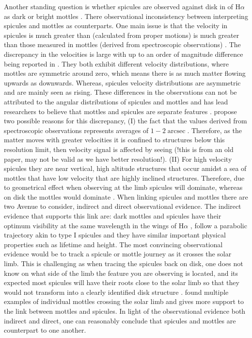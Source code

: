 \documentclass[12pt]{ociamthesis}
\DeclareMathOperator{\arcsec}{arcsec}
\begin{document}
\par Another standing question is whether spicules are observed against disk in of H$\alpha$ as dark or bright mottles \citep{Tsiropoula1993A}. There observational inconsistency between interpreting spicules and mottles as counterparts. One main issue is that the velocity in spicules is much greater than (calculated from proper motions) is much greater than those measured in mottles (derived from spectroscopic observations) \cite{Grossmann1992AA264236G, Christopoulou2001SoPh19961C}. The discrepancy in the velocities is large with up to an order of magnitude difference being reported in \cite{Grossmann1973SoPh28319G}. They both exhibit different velocity distributions, where mottles are symmetric around zero, which means there is as much matter flowing upwards as downwards. Whereas, spicules velocity distributions are asymmetric and  are mainly seen as rising. These differences in the observations can not be attributed to the angular distributions of spicules and mottles \cite{Grossmann1992AA264236G} and has lead researchers to believe that mottles and spicules are separate features \cite{Christopoulou2001SoPh19961C}. \cite{Christopoulou2001SoPh19961C} propose two possible reasons for this discrepancy, (I) the fact that the values derived from spectroscopic observations represents averages of $1-2\arcsec$. Therefore, as the matter moves with greater velocities it is confined to structures below this resolution limit, then velocity signal is affected by seeing (!this is from an old paper, may not be valid as we have better resolution!). (II) For high velocity spicules they are near vertical, high altitude structures that occur amidst a sea of mottles that have low velocity that are highly inclined structures. Therefore, due to geometrical effect when observing at the limb spicules will dominate, whereas on disk the mottles would dominate \citep{Grossmann1992AA264236G}. When linking spicules and mottles there are two Avenue to consider, indirect and direct observational evidence. The indirect evidence that supports this link are: dark mottles and spicules have their optimum visibility at the same wavelength in the wings of H$\alpha$ \citep{Tsiropoula1993A}, follow a parabolic trajectory akin to type I spicules \cite{Rouppe2007ApJ660L169R} and they have similar important physical properties such as lifetime and height. The most convincing observational evidence would be to track a spicule or mottle journey as it crosses the solar limb. This is challenging as when tracing the spicules back on disk, one does not know on what side of the limb the feature you are observing is located, and its expected most spicules will have their roots close to the solar limb so that they would not transform into a clearly identified disk structure \cite{Beckers1968}. \cite{Christopoulou2001SoPh19961C} found multiple examples of individual mottles crossing the solar limb and gives more support to the link between mottles and spicules. In light of the observational evidence both indirect and direct, one can reasonably conclude that spicules and mottles are counterpart to one another.
\end{document}
